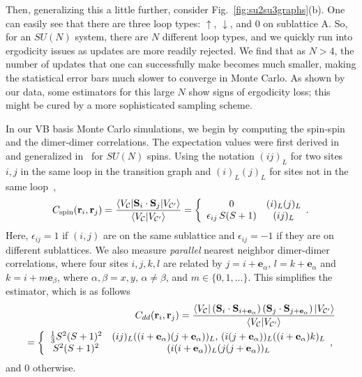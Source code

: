 \documentclass[11pt]{iopart}
\begin{document}
Then, generalizing this a little further, consider Fig.~\ref{fig:su2su3graphs}(b).
One can easily see that there are three loop types: $\uparrow$, $\downarrow$, and 0 on sublattice A.
So, for an $SU(N)$ system, there are $N$ different loop types, and we quickly run into ergodicity issues as updates are more readily rejected.
We find that as $N>4$, the number of updates that one can successfully make becomes much smaller, making the statistical error bars much slower to converge in Monte Carlo.
As shown by our data, some estimators for this large $N$ show signs of ergodicity loss; this might be cured by a more sophisticated sampling scheme.



In our VB basis Monte Carlo simulations, we begin by computing the spin-spin and the dimer-dimer correlations. The expectation values were first derived in~\cite{beach2006some} and generalized in~\cite{beach2009n} for $SU(N)$ spins.  Using the notation $(ij)_L$ for two sites $i,j$ in the same loop in the transition graph and $(i)_L(j)_L$ for sites not in the same loop~\cite{RVB2},
%
\begin{equation}
	C_{\rm spin}({\bf r}_i, {\bf r}_j) 
		= \frac{\langle V_\mathcal{C} | \mathbf{S}_i \cdot \mathbf{S}_j | V_{\mathcal{C}'} \rangle}
			{\langle V_\mathcal{C} | V_{\mathcal{C}'} \rangle}
		 = \left\{ \begin{array}{ccc}
			0 & (i)_L (j)_L\\
			\epsilon_{ij} \, S (S+1) & (ij)_L   \end{array}. \right.
\end{equation}
%
Here, $\epsilon_{ij} = 1$ if $(i,j)$ are on the same sublattice and $\epsilon_{ij} = -1$ if they are on different sublattices.
%
We also measure \textit{parallel} nearest neighbor dimer-dimer correlations, where four sites $i,j,k,l$ are related by $j = i + \mathbf{e}_\alpha, \, l = k + \mathbf{e}_\alpha$ and $k = i + m \mathbf{e}_\beta$, where $\alpha,\beta = x, y, \, \alpha \neq \beta$, and $m \in \{0,1,...\}$.
%
This simplifies the estimator, which is as follows
%
\begin{eqnarray}
	C_{dd}({\bf r}_i, {\bf r}_j)  = 
			\frac{\langle V_\mathcal{C} | \left( \mathbf{S}_i \cdot \mathbf{S}_{i+\mathbf{e}_\alpha} \right) \left( \mathbf{S}_j \cdot \mathbf{S}_{j+\mathbf{e}_\alpha}  \right) 
					| V_{\mathcal{C}'} \rangle}{\langle V_\mathcal{C} | V_{\mathcal{C}'} \rangle} \\
					 = \left\{ \begin{array}{ccc}
				\frac{1}{3} S^2 (S+1)^2 & (ij)_L ((i+\mathbf{e}_\alpha)(j+\mathbf{e}_\alpha))_L, \,(i(j+\mathbf{e}_\alpha))_L ((i+\mathbf{e}_\alpha)k)_L\\
		S^2 (S+1)^2 & (i(i+\mathbf{e}_\alpha))_L (j(j+\mathbf{e}_\alpha))_L \end{array}, \right.
\end{eqnarray}
%
and $0$ otherwise.
\end{document}
